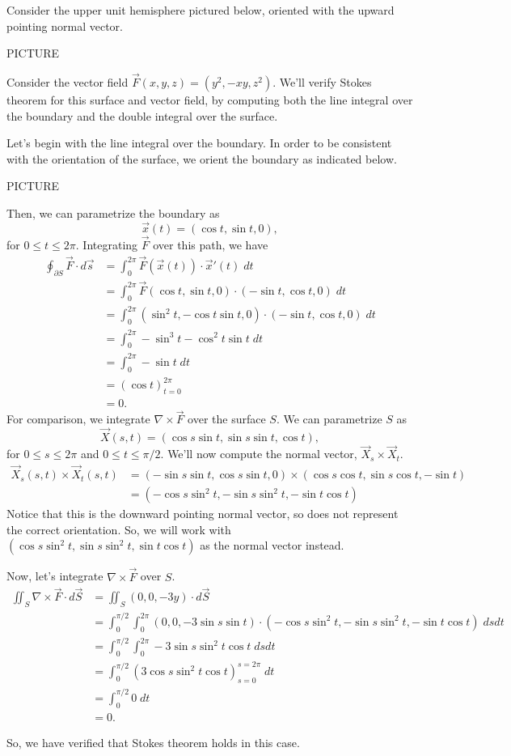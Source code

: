 \documentclass{ximera}
\begin{document}
\begin{example}
Consider the upper unit hemisphere pictured below, oriented with the upward pointing normal vector.

PICTURE

Consider the vector field $\vec{F}(x,y,z) = (y^2, -xy, z^2)$. We'll verify Stokes theorem for this surface and vector field, by computing both the line integral over the boundary and the double integral over the surface.

Let's begin with the line integral over the boundary. In order to be consistent with the orientation of the surface, we orient the boundary as indicated below.

PICTURE

Then, we can parametrize the boundary as
\[
\vec{x}(t) = (\cos t, \sin t, 0),
\]
for $0\leq t\leq 2\pi$. Integrating $\vec{F}$ over this path, we have
\begin{align*}
\oint_{\partial S} \vec{F}\cdot d\vec{s} &= \int_0^{2\pi} \vec{F}(\vec{x}(t))\cdot \vec{x}'(t)\;dt\\
&= \int_0^{2\pi}\vec{F}(\cos t, \sin t, 0)\cdot (-\sin t, \cos t, 0)\;dt\\
&= \int_0^{2\pi}(\sin^2 t, -\cos t\sin t, 0)\cdot (-\sin t, \cos t, 0)\;dt\\
&= \int_0^{2\pi} -\sin^3 t -\cos^2 t\sin t\;dt\\
&= \int_0^{2\pi} -\sin t\;dt\\
&= (\cos t)_{t = 0}^{2\pi}\\
&= 0.
\end{align*}
For comparison, we integrate $\nabla\times\vec{F}$ over the surface $S$. We can parametrize $S$ as
\[
\vec{X}(s,t) = (\cos s\sin t, \sin s\sin t, \cos t),
\]
for $0\leq s\leq 2\pi$ and $0\leq t\leq \pi/2$. We'll now compute the normal vector, $\vec{X}_s\times \vec{X}_t$.
\begin{align*}
\vec{X}_s(s,t)\times\vec{X}_t(s,t) &= (-\sin s\sin t, \cos s\sin t, 0)\times (\cos s\cos t, \sin s\cos t, -\sin t)\\
&= (-\cos s\sin^2 t,-\sin s\sin^2 t,-\sin t\cos t)
\end{align*}
Notice that this is the downward pointing normal vector, so does not represent the correct orientation. So, we will work with $(\cos s\sin^2 t,\sin s\sin^2 t,\sin t\cos t)$ as the normal vector instead.

Now, let's integrate $\nabla\times\vec{F}$ over $S$.
\begin{align*}
\iint_S \nabla\times\vec{F}\cdot d\vec{S} &= \iint_S (0,0,-3y)\cdot d\vec{S}\\
&= \int_0^{\pi/2}\int_0^{2\pi} (0,0,-3\sin s\sin t)\cdot (-\cos s\sin^2 t,-\sin s\sin^2 t,-\sin t\cos t)\;dsdt\\
&= \int_0^{\pi/2}\int_0^{2\pi} -3\sin s\sin^2 t \cos t\;dsdt\\
&= \int_0^{\pi/2}(3\cos s\sin^2t\cos t)_{s = 0}^{s = 2\pi}\;dt\\
&= \int_0^{\pi/2} 0\;dt\\
&= 0.
\end{align*}

So, we have verified that Stokes theorem holds in this case.
\end{example}
\end{document}
